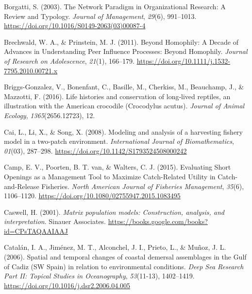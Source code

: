 \documentclass[
]{article}
\newlength{\cslhangindent}
\newlength{\cslentryspacingunit} %
\newenvironment{CSLReferences}[2] %
 {%
  \setlength{\parindent}{0pt}
  \ifodd #1
  \let\oldpar\par
  \def\par{\hangindent=\cslhangindent\oldpar}
  \fi
  \setlength{\parskip}{#2\cslentryspacingunit}
 }%
 {}
\begin{document}
\begin{CSLReferences}{1}{0}
\leavevmode{}%
Borgatti, S. (2003). The {Network} {Paradigm} in {Organizational} {Research}: {A} {Review} and {Typology}. \emph{Journal of Management}, \emph{29}(6), 991--1013. \url{https://doi.org/10.1016/S0149-2063(03)00087-4}

\leavevmode{}%
Brechwald, W. A., \& Prinstein, M. J. (2011). Beyond {Homophily}: {A} {Decade} of {Advances} in {Understanding} {Peer} {Influence} {Processes}: {Beyond} {Homophily}. \emph{Journal of Research on Adolescence}, \emph{21}(1), 166--179. \url{https://doi.org/10.1111/j.1532-7795.2010.00721.x}

\leavevmode{}%
Briggs-Gonzalez, V., Bonenfant, C., Basille, M., Cherkiss, M., Beauchamp, J., \& Mazzotti, F. (2016). Life histories and conservation of long‐lived reptiles, an illustration with the {American} crocodile ({Crocodylus} acutus). \emph{Journal of Animal Ecology}, \emph{1365}(2656.12723), 12.

\leavevmode{}%
Cai, L., Li, X., \& Song, X. (2008). Modeling and analysis of a harvesting fishery model in a two-patch environment. \emph{International Journal of Biomathematics}, \emph{01}(03), 287--298. \url{https://doi.org/10.1142/S1793524508000242}

\leavevmode{}%
Camp, E. V., Poorten, B. T. van, \& Walters, C. J. (2015). Evaluating {Short} {Openings} as a {Management} {Tool} to {Maximize} {Catch}-{Related} {Utility} in {Catch}-and-{Release} {Fisheries}. \emph{North American Journal of Fisheries Management}, \emph{35}(6), 1106--1120. \url{https://doi.org/10.1080/02755947.2015.1083495}

\leavevmode{}%
Caswell, H. (2001). \emph{Matrix population models: {Construction}, analysis, and interpretation}. Sinauer Associates. \url{https://books.google.com/books?id=CPsTAQAAIAAJ}

\leavevmode{}%
Catalán, I. A., Jiménez, M. T., Alconchel, J. I., Prieto, L., \& Muñoz, J. L. (2006). Spatial and temporal changes of coastal demersal assemblages in the {Gulf} of {Cadiz} ({SW} {Spain}) in relation to environmental conditions. \emph{Deep Sea Research Part II: Topical Studies in Oceanography}, \emph{53}(11-13), 1402--1419. \url{https://doi.org/10.1016/j.dsr2.2006.04.005}


\end{CSLReferences}
\end{document}
